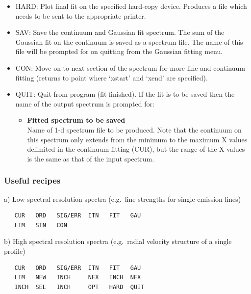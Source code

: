 \documentclass[11pt,twoside]{article}
\begin{document}
\begin{itemize}
\item
   HARD: Plot final fit on the specified hard-copy device. Produces a
   file which needs to be sent to the appropriate printer.

\item
   SAV: Save the continuum and Gaussian fit spectrum. The sum of the
   Gaussian fit on the continuum is saved as a spectrum file. The name
   of this file will be prompted for on quitting from the Gaussian
   fitting menu.

\item
   CON: Move on to next section of the spectrum for more line and
   continuum fitting (returns to point where `xstart' and `xend' are
   specified).

\item
   QUIT: Quit from program (fit finished).  If the fit is to be saved
   then the name of the output spectrum is prompted for:

\begin{itemize}
\item{\bf Fitted spectrum to be saved}\ \\
      Name of 1-d spectrum file to be produced. Note that the continuum
      on this spectrum only extends from the minimum to the maximum X values
      delimited in the continuum fitting (CUR), but the range of the X values
      is the same as that of the input spectrum.
\end{itemize}

\end{itemize}


\subsubsection{\label{techno12recipes}Useful recipes}

   a) Low spectral resolution spectra (e.g.\ line strengths for single
   emission lines)

\begin{verbatim}
   CUR   ORD   SIG/ERR  ITN   FIT   GAU
   LIM   SIN   CON
\end{verbatim}

   b) High spectral resolution spectra (e.g.\ radial velocity structure of
   a single profile)

\begin{verbatim}
   CUR   ORD   SIG/ERR  ITN   FIT   GAU
   LIM   NEW   INCH     NEX   INCH  NEX
   INCH  SEL   INCH     OPT   HARD  QUIT
\end{verbatim}
\end{document}
